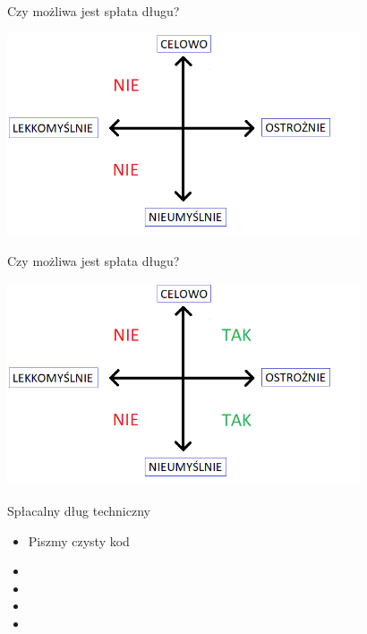 \documentclass{beamer}
\begin{document}
\begin{frame}{Czy możliwa jest spłata długu{?}}
\begin{center}
  	\includegraphics[height=6cm]{splata_dlugu2.png}
\end{center}
\end{frame}

\begin{frame}{Czy możliwa jest spłata długu{?}}
\begin{center}
  	\includegraphics[height=6cm]{splata_dlugu3.png}
\end{center}
\end{frame}

\begin{frame}{Spłacalny dług techniczny}
     \begin{Large}
	\begin{itemize}
		\item Piszmy czysty kod
		\item 
		\item 
		\item 
		\item 
	\end{itemize}
     \end{Large}
\end{frame}
\end{document}
